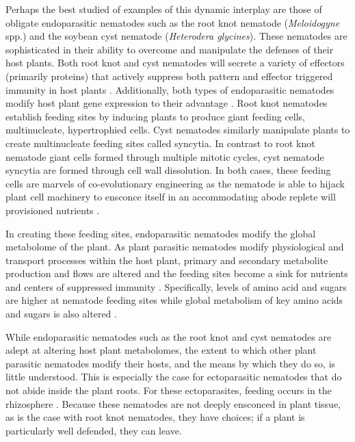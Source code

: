 \documentclass[9pt,lineno]{elife}
\begin{document}
Perhaps the best studied of examples of this dynamic interplay are those of obligate endoparasitic nematodes such as the root knot nematode (\textit{Meloidogyne}  spp.) and the soybean cyst nematode (\textit{Heterodera glycines}).  These nematodes are sophisticated in their ability to overcome and manipulate the defenses of their host plants.  Both root knot and cyst nematodes will secrete a variety of effectors (primarily proteins) that actively suppress both pattern and effector triggered immunity in host plants \citep{mitchum2013nematode, mantelin2015suppression, vanholme2004secretions, vieira2019plant}.  Additionally, both types of endoparasitic nematodes modify host plant gene expression to their advantage \citep{de2015plant}.  Root knot nematodes establish feeding sites by inducing plants to produce giant feeding cells, multinucleate, hypertrophied cells. Cyst nematodes similarly manipulate plants to create multinucleate feeding sites  called syncytia. In contrast to root knot nematode giant cells formed through multiple mitotic cycles, cyst nematode syncytia are formed through cell wall dissolution.   In both cases, these feeding cells are marvels of co-evolutionary engineering as the nematode is able to hijack plant cell machinery to ensconce itself in an accommodating abode replete will provisioned nutrients \citep{siddique2018parasitic, de2015plant,siddique2015metabolism}.  

In creating these feeding sites, endoparasitic nematodes modify the global metabolome of the plant.  As plant parasitic nematodes modify physiological and transport processes within the host plant, primary and secondary metabolite production and flows are altered and the feeding sites become a sink for nutrients and centers of suppressed immunity \citep{bartlem2013vascularization}.  Specifically, levels of amino acid and sugars are higher at nematode feeding sites \citep{siddique2015metabolism} while global metabolism of key amino acids and sugars is also altered \citep{eloh2016untargeted, hofmann2010metabolic}.  


While endoparasitic nematodes such as the root knot and cyst nematodes are adept at altering host plant metabolomes, the extent to which other plant parasitic nematodes modify their hosts, and the means by which they do so, is little understood.  This is especially the case for ectoparasitic nematodes that do not abide inside the plant roots.  For these ectoparasites, feeding occurs in the rhizosphere \citep{sijmons1994parasitic}.  Because these nematodes are not deeply ensconced in plant tissue, as is the case with root knot nematodes, they have choices; if a plant is particularly well defended, they can leave.  
\end{document}
